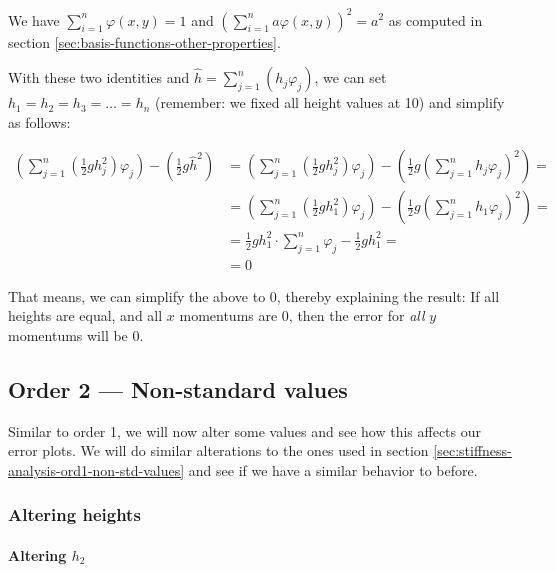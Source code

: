 \documentclass{article}
\renewcommand{\phi}{\varphi}
\begin{document}

We have $\sum_{i=1}^n \phi(x,y)=1$ and  $(\sum_{i=1}^n a \phi(x,y))^2 = a^2$ as computed in section \ref{sec:basis-functions-other-properties}.

With these two identities and $\widehat{h}=\sum_{j=1}^n \left(h_j \phi_j\right)$, we can set $h_1=h_2=h_3=\dots=h_n$ (remember: we fixed all height values at 10) and simplify as follows:

\begin{align*}
  \left( \sum_{j=1}^n \left(\frac{1}{2} g h_j^2\right) \phi_j \right) - \left( \frac{1}{2} g \widehat{h}^2\right) &= \left( \sum_{j=1}^n \left(\frac{1}{2} g h_j^2\right) \phi_j \right) - \left( \frac{1}{2} g \left( \sum_{j=1}^n h_j\phi_j \right)^2\right) = \\
  &= \left( \sum_{j=1}^n \left(\frac{1}{2} g h_1^2\right) \phi_j \right) - \left( \frac{1}{2} g \left( \sum_{j=1}^n h_1\phi_j \right)^2\right) = \\
  &= \frac{1}{2} g h_1^2 \cdot \sum_{j=1}^n \phi_j - \frac{1}{2} g h_1^2 = \\
  &= 0
\end{align*}

That means, we can simplify the above to 0, thereby explaining the result: If all heights are equal, and all $x$ momentums are 0, then the error for \emph{all} $y$ momentums will be 0.

\subsection{Order 2 --- Non-standard values}
\label{sec:stiffness-analysis-ord2-nondefault}

Similar to order 1, we will now alter some values and see how this affects our error plots. We will do similar alterations to the ones used in section \ref{sec:stiffness-analysis-ord1-non-std-values} and see if we have a similar behavior to before.

\subsubsection{Altering heights}
\label{sec:stiffness-analysis-ord2-nondefault-altering-heights}

\paragraph{\texorpdfstring{Altering $h_2$}{Altering h2}}
\end{document}
